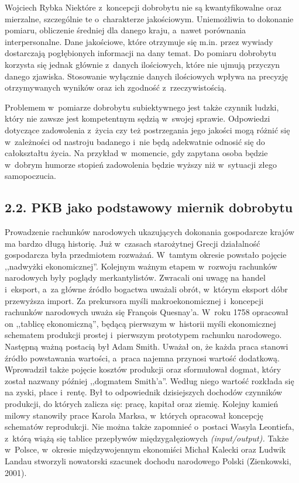 \begin{artplenv}{Wojciech Rybka}
Niektóre z~koncepcji dobrobytu nie są kwantyfikowalne oraz mierzalne, szczególnie te o~charakterze jakościowym.
Uniemożliwia to dokonanie pomiaru, obliczenie średniej dla danego kraju, a~nawet porównania interpersonalne. Dane
jakościowe, które otrzymuje się m.in. przez wywiady dostarczają pogłębionych informacji na dany temat. Do pomiaru
dobrobytu korzysta się jednak głównie z~danych ilościowych, które nie ujmują przyczyn danego zjawiska. Stosowanie
wyłącznie danych ilościowych wpływa na precyzję otrzymywanych wyników oraz ich zgodność z~rzeczywistością.

Problemem w~pomiarze dobrobytu subiektywnego jest także czynnik ludzki, który nie zawsze jest kompetentnym
sędzią w~swojej sprawie. Odpowiedzi dotyczące zadowolenia z~życia czy też postrzegania
jego jakości mogą różnić się w~zależności
od nastroju badanego i~nie będą adekwatnie odnosić się do całokształtu życia. Na przykład w~momencie, gdy zapytana
osoba będzie w~dobrym humorze stopień zadowolenia będzie wyższy niż w~sytuacji złego samopoczucia. 

\subsection{2.2. PKB jako podstawowy miernik dobrobytu}
Prowadzenie rachunków narodowych ukazujących dokonania gospodarcze krajów ma bardzo długą historię. Już w~czasach
starożytnej Grecji działalność gospodarcza była przedmiotem rozważań. W~tamtym okresie powstało pojęcie ,,nadwyżki
ekonomicznej''. Kolejnym ważnym etapem w~rozwoju rachunków narodowych były poglądy merkantylistów. Zwracali oni uwagę na
handel i~eksport, a~za główne źródło bogactwa uważali obrót, w~którym eksport dóbr przewyższa import. Za prekursora
myśli makroekonomicznej i~koncepcji rachunków narodowych uważa się François Quesnay’a. W~roku 1758 opracował on
,,tablicę ekonomiczną'', będącą pierwszym w~historii myśli ekonomicznej schematem produkcji prostej i~pierwszym
prototypem rachunku narodowego. Następną ważną postacią był Adam Smith. Uważał on, że każda praca stanowi źródło
powstawania wartości, a~praca najemna przynosi wartość dodatkową. Wprowadził także pojęcie kosztów produkcji oraz
sformułował dogmat, który został nazwany później ,,dogmatem Smith’a''. Według niego wartość rozkłada się na zyski, płace
i~rentę. Był to odpowiednik dzisiejszych dochodów czynników produkcji, do których zalicza się: pracę, kapitał oraz
ziemię. Kolejny kamień milowy stanowiły prace Karola Marksa, w~których opracował koncepcję schematów reprodukcji. Nie
można także zapomnieć o~postaci Wasyla Leontiefa, z~którą wiążą się tablice przepływów międzygałęziowych
\textit{(input/output). }Także w~Polsce, w~okresie międzywojennym ekonomiści Michał Kalecki oraz Ludwik Landau
stworzyli nowatorski szacunek dochodu narodowego Polski \label{ref:RNDkzvKN1pPEK}(Zienkowski, 2001). 


\end{artplenv}
